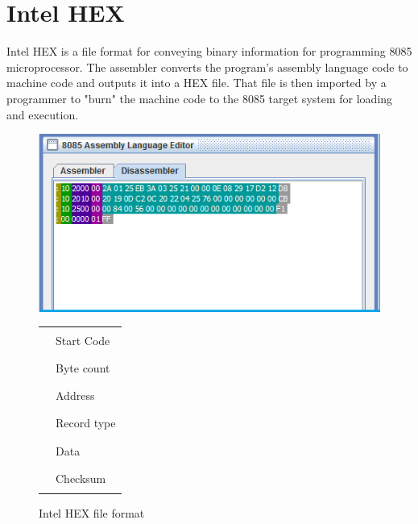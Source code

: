 \section{Intel HEX}
Intel HEX\cite{hex}  is a file format for conveying binary information for programming 8085 microprocessor. The assembler converts the program's assembly language code to machine code and outputs it into a HEX file. That file is then imported by a programmer to "burn" the machine code to the 8085 target system for loading and execution.

\begin{figure}[H]
\centering
\includegraphics{"./disassemble"}
\begin{tabular}{cl}
{\color[HTML]{999900}\rule{0.5cm}{0.5cm}} & Start Code\\
{\color[HTML]{009900}\rule{0.5cm}{0.5cm}} & Byte count\\
{\color[HTML]{4C0099}\rule{0.5cm}{0.5cm}} & Address\\
{\color[HTML]{990099}\rule{0.5cm}{0.5cm}} & Record type\\
{\color[HTML]{009999}\rule{0.5cm}{0.5cm}} & Data\\
{\color[HTML]{999999}\rule{0.5cm}{0.5cm}} & Checksum
\end{tabular}

\caption[width=0.75\linewidth]{Intel HEX file format}
\label{fig:hex}
\end{figure}

